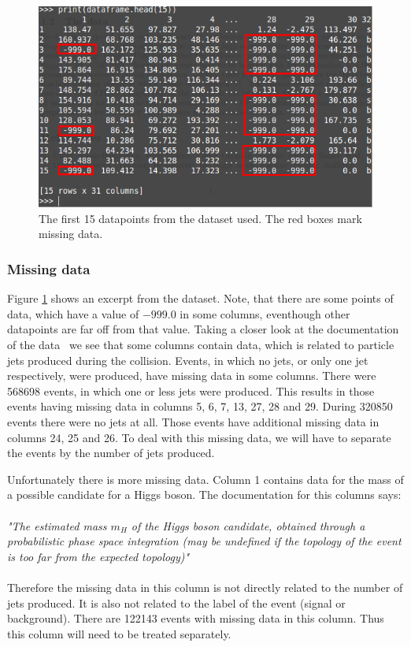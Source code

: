 \begin{figure}[t]
    \centering
    \includegraphics[width=\linewidth]{figures/datainfo_red.png}
    \caption{The first 15 datapoints from the dataset used. The red boxes mark missing data.}
    \label{fig:intro:datainfo}
\end{figure}

\subsubsection{Missing data}\label{subsubsec:intro:data:missing}

Figure \ref{fig:intro:datainfo} shows an excerpt from the dataset.
Note, that there are some points of data, which have a value of $-999.0$ in some columns, eventhough other datapoints are far off from that value.
Taking a closer look at the documentation of the data~\cite{adam2014learning} we see that some columns contain data, which is related to particle jets produced during the collision.
Events, in which no jets, or only one jet respectively, were produced, have missing data in some columns.
There were 568698 events, in which one or less jets were produced.
This results in those events having missing data in columns 5, 6, 7, 13, 27, 28 and 29.
During 320850 events there were no jets at all.
Those events have additional missing data in columns 24, 25 and 26.
To deal with this missing data, we will have to separate the events by the number of jets produced.

Unfortunately there is more missing data.
Column 1 contains data for the mass of a possible candidate for a Higgs boson.
The documentation for this columns says:\\
\\
\textit{"The estimated mass $m_H$ of the Higgs boson candidate, obtained through a probabilistic phase space integration (may be undefined if the topology of the event is too far from the expected topology)"}\\
\\
Therefore the missing data in this column is not directly related to the number of jets produced.
It is also not related to the label of the event (signal or background).
There are 122143 events with missing data in this column.
Thus this column will need to be treated separately.
